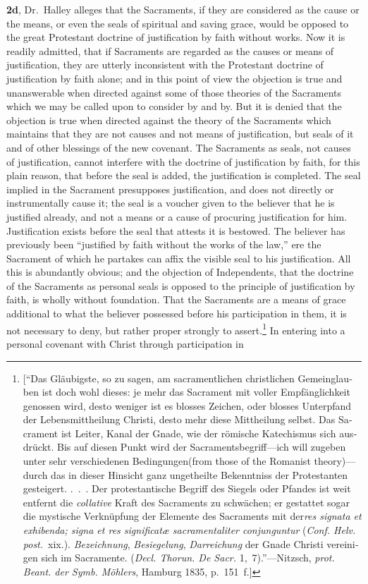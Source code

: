 \documentclass[
]{book}
\begin{document}
\textbf{2d}, Dr.~Halley alleges that the Sacraments, if they are considered as the cause or the means, or even the seals of spiritual and saving grace, would be opposed to the great Protestant doctrine of justification by faith without works. Now it is readily admitted, that if Sacraments are regarded as the causes or means of justification, they are utterly inconsistent with the Protestant doctrine of justification by faith alone; and in this point of view the objection is true and unanswerable when directed against some of those theories of the Sacraments which we may be called upon to consider by and by. But it is denied that the objection is true when directed against the theory of the Sacraments which maintains that they are not causes and not means of justification, but seals of it and of other blessings of the new covenant. The Sacraments as seals, not causes of justification, cannot interfere with the doctrine of justification by faith, for this plain reason, that before the seal is added, the justification is completed. The seal implied in the Sacrament presupposes justification, and does not directly or instrumentally cause it; the seal is a voucher given to the believer that he is justified already, and not a means or a cause of procuring justification for him. Justification exists before the seal that attests it is bestowed. The believer has previously been ``justified by faith without the works of the law,'' ere the Sacrament of which he partakes can affix the visible seal to his justification. All this is abundantly obvious; and the objection of Independents, that the doctrine of the Sacraments as personal seals is opposed to the principle of justification by faith, is wholly without foundation. That the Sacraments are a means of grace additional to what the believer possessed before his participation in them, it is not necessary to deny, but rather proper strongly to assert.\footnote{{[}``\foreignlanguage{ngerman}{Das Gläubigste, so zu sagen, am sacramentlichen christlichen Gemeinglauben ist doch wohl dieses: je mehr das Sacrament mit voller Empfänglichkeit genossen wird, desto weniger ist es blosses Zeichen, oder blosses Unterpfand der Lebensmittheilung Christi, desto mehr diese Mittheilung selbst. Das Sacrament ist Leiter, Kanal der Gnade, wie der römische Katechismus sich ausdrückt. Bis auf diesen Punkt wird der Sacramentsbegriff---ich will zugeben unter sehr verschiedenen Bedingungen}(from those of the Romanist theory)\foreignlanguage{ngerman}{---durch das in dieser Hinsicht ganz ungetheilte Bekenntniss der Protestanten gesteigert. .~.~. Der protestantische Begriff des Siegels oder Pfandes ist weit entfernt die \emph{collative} Kraft des Sacraments zu schwächen; er gestattet sogar die mystische Verknüpfung der Elemente des Sacraments mit der}\foreignlanguage{latin}{\emph{res signata et exhibenda; signa et res significatæ sacramentaliter conjunguntur}} (\foreignlanguage{latin}{\emph{Conf. Helv. post.}}~xix.). \foreignlanguage{ngerman}{\emph{Bezeichnung}, \emph{Besiegelung}, \emph{Darreichung} der Gnade Christi vereinigen sich im Sacramente.} (\foreignlanguage{latin}{\emph{Decl. Thorun. De Sacr.}} 1,~7).''---Nitzsch, \emph{prot. Beant. der Symb. Möhlers}, Hamburg 1835, p.~151~f.{]}} In entering into a personal covenant with Christ through participation in 
\end{document}
